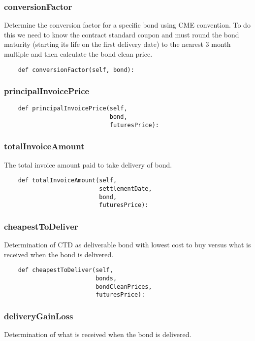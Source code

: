 \documentclass[twoside,11pt]{book}
\begin{document}
\subsubsection*{{\bf conversionFactor}}
Determine the conversion factor for a specific bond using CME convention. To do this we need to know the contract standard coupon and must round the bond maturity (starting its life on the first delivery date) to the nearest 3 month multiple and then calculate the bond clean price.  

\begin{lstlisting}
    def conversionFactor(self, bond):
\end{lstlisting}

\subsubsection*{{\bf principalInvoicePrice}}


\begin{lstlisting}
    def principalInvoicePrice(self,
                              bond,
                              futuresPrice):
\end{lstlisting}

\subsubsection*{{\bf totalInvoiceAmount}}
The total invoice amount paid to take delivery of bond.  

\begin{lstlisting}
    def totalInvoiceAmount(self,
                           settlementDate,
                           bond,
                           futuresPrice):
\end{lstlisting}

\subsubsection*{{\bf cheapestToDeliver}}
Determination of CTD as deliverable bond with lowest cost to buy versus what is received when the bond is delivered.  

\begin{lstlisting}
    def cheapestToDeliver(self,
                          bonds,
                          bondCleanPrices,
                          futuresPrice):
\end{lstlisting}

\subsubsection*{{\bf deliveryGainLoss}}
Determination of what is received when the bond is delivered.  
\end{document}
